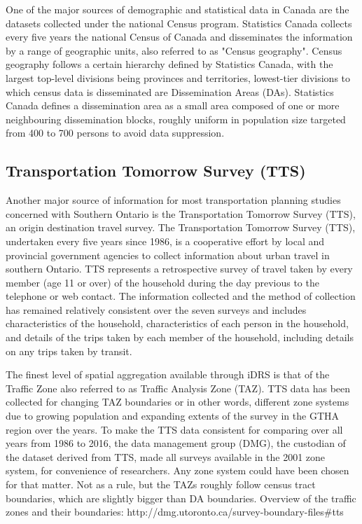 One of the major sources of demographic and statistical data in Canada are the datasets collected under the national Census program.
Statistics Canada collects every five years the national Census of Canada and disseminates the information by a range of geographic units, also referred to as "Census geography"\cite{MapandDataLibrary2019}.
Census geography follows a certain hierarchy defined by Statistics Canada, with the largest top-level divisions being provinces and territories, lowest-tier divisions to which census data is disseminated are Dissemination Areas (DAs)\cite{StatisticsCanada2018}.
Statistics Canada defines a dissemination area as a small area composed of one or more neighbouring dissemination blocks, roughly uniform in population size targeted from 400 to 700 persons to avoid data suppression\cite{StatisticsCanada2015}.

\subsection{Transportation Tomorrow Survey (TTS)} \label{subsec:tts_description}

Another major source of information for most transportation planning studies concerned with Southern Ontario is the Transportation Tomorrow Survey (TTS)\cite{DataManagementGroup2014}, an origin destination travel survey.
The Transportation Tomorrow Survey (TTS), undertaken every five years since 1986, is a cooperative effort by local and provincial government agencies to collect information about urban travel in southern Ontario.
TTS represents a retrospective survey of travel taken by every member (age 11 or over) of the household during the day previous to the telephone or web contact.
The information collected and the method of collection has remained relatively consistent over the seven surveys and includes characteristics of the household, characteristics of each person in the household, and details of the trips taken by each member of the household, including details on any trips taken by transit\cite{Ashby2018}.

The finest level of spatial aggregation available through iDRS is that of the Traffic Zone also referred to as Traffic Analysis Zone (TAZ).
TTS data has been collected for changing TAZ boundaries or in other words, different zone systems due to growing population and expanding extents of the survey in the GTHA region over the years.
To make the TTS data consistent for comparing over all years from 1986 to 2016, the data management group (DMG), the custodian of the dataset derived from TTS, made all surveys available in the 2001 zone system, for convenience of researchers.
Any zone system could have been chosen for that matter.
Not as a rule, but the TAZs roughly follow census tract boundaries, which are slightly bigger than DA boundaries.
Overview of the traffic zones and their boundaries: http://dmg.utoronto.ca/survey-boundary-files#tts

